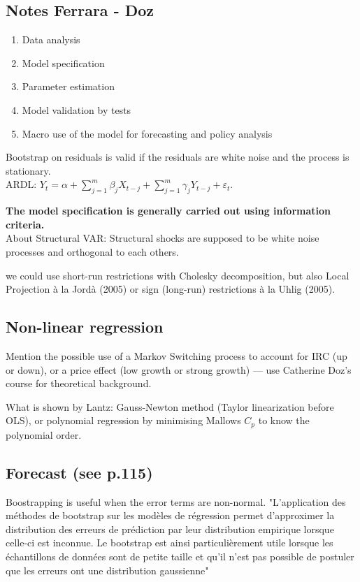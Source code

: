 \subsection{Notes Ferrara - Doz}
\begin{enumerate}
    \item Data analysis
    \item Model specification
    \item Parameter estimation
    \item Model validation by tests
    \item Macro use of the model for forecasting and policy analysis
\end{enumerate}

Bootstrap on residuals is valid if the residuals are white noise and the process is stationary. \\

ARDL: $Y_t = \alpha + \sum_{j=1}^m \beta_j X_{t-j} + \sum_{j=1}^m \gamma_j Y_{t-j} + \varepsilon_t$. 

\textbf{The model specification is generally carried out using
information criteria. }
\\

About Structural VAR: Structural shocks are supposed to be white noise processes and orthogonal to each others.

we could use short-run restrictions with Cholesky decomposition, but also Local Projection à la Jordà (2005) or sign (long-run) restrictions à la Uhlig (2005).

\subsection{Non-linear regression}
Mention the possible use of a Markov Switching process to account for IRC (up or down), or a price effect (low growth or strong growth) — use Catherine Doz's course for theoretical background.

What is shown by Lantz: Gauss-Newton method (Taylor linearization before OLS), or polynomial regression by minimising Mallows $C_p$ to know the polynomial order. 

\subsection{Forecast (see p.115)}
Boostrapping is useful when the error terms are non-normal. "L’application des méthodes de bootstrap sur les modèles de régression permet d’approximer la distribution des erreurs de prédiction par leur distribution empirique lorsque celle-ci est inconnue. Le bootstrap est ainsi particulièrement utile lorsque les
échantillons de données sont de petite taille et qu’il n’est pas possible de postuler que les erreurs ont une distribution gaussienne"

